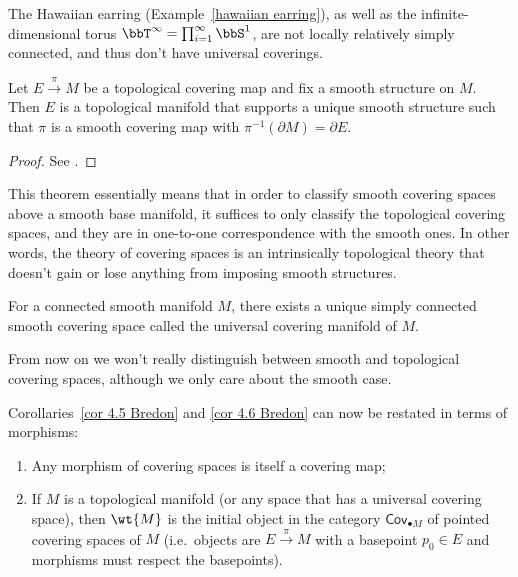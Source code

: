 \begin{example}
    The Hawaiian earring (Example~\ref{hawaiian earring}), as well as the infinite-dimensional torus $\bbT^\infty=\prod_{i=1}^\infty \bbS^1$, are not locally relatively simply connected, and thus don't have universal coverings.
\end{example}

\begin{thm}
Let $E\overset{\pi}{\to}M$ be a topological covering map and fix a smooth structure on $M$. Then $E$ is a topological manifold that supports a unique smooth structure such that $\pi$ is a smooth covering map with $\pi^{-1}(\partial M)=\partial E$.
\end{thm}
\begin{proof}
See \cite[Prop 4.40]{Lee}.
\end{proof}
This theorem essentially means that in order to classify smooth covering spaces above a smooth base manifold, it suffices to only classify the topological covering spaces, and they are in one-to-one correspondence with the smooth ones. In other words, the theory of covering spaces is an intrinsically topological theory that doesn't gain or lose anything from imposing smooth structures.

\begin{cor}
For a connected smooth manifold $M$, there exists a unique simply connected smooth covering space called the universal covering manifold of $M$.
\end{cor}
From now on we won't really distinguish between smooth and topological covering spaces, although we only care about the smooth case.

Corollaries~\ref{cor 4.5 Bredon} and \ref{cor 4.6 Bredon} can now be restated in terms of morphisms:
\begin{cor}
    \;
    \begin{enumerate}
       \item Any morphism of covering spaces is itself a covering map;
        \item If $M$ is a topological manifold (or any space that has a universal covering space), then $\wt{M}$ is the initial object in the category $\mathsf{Cov}_{\bullet M}$ of pointed covering spaces of $M$ (i.e.\ objects are $E\overset\pi\to M$ with a basepoint $p_0\in E$ and morphisms must respect the basepoints).
    \end{enumerate}
\end{cor}

